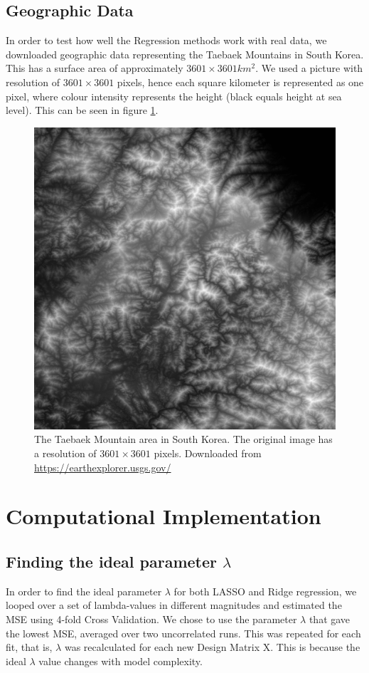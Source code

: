 \documentclass[11pt,a4paper,titlepage]{article}
\begin{document}
\subsection{Geographic Data}
In order to test how well the Regression methods work with real data, we downloaded geographic data representing the Taebaek Mountains in South Korea. This has a surface area of approximately $3601\times 3601 km^2$. We used a picture with resolution of $3601\times 3601$ pixels, hence each square kilometer is represented as one pixel, where colour intensity represents the height (black equals height at sea level). This can be seen in figure \ref{Korea}.
\begin{figure}[H]
\centering
\includegraphics[trim=1cm 0.2cm 1.5cm 1.2cm, clip=true,scale = 0.05]{../figures/presentable_data/korea.png}
\caption[Taebbaek Mountain]{The Taebaek Mountain area in South Korea. The original image has a resolution of $3601\times 3601$ pixels. Downloaded from \url{https://earthexplorer.usgs.gov/} }\label{Korea}
\end{figure}
\section{Computational Implementation}
\subsection{Finding the ideal parameter $\lambda$}
In order to find the ideal parameter $\lambda$ for both LASSO and Ridge regression, we looped over a set of lambda-values in different magnitudes and estimated the MSE using 4-fold Cross Validation. We chose to use the parameter $\lambda$ that gave the lowest MSE, averaged over two uncorrelated runs. This was repeated for each fit, that is,  $\lambda$ was recalculated for each new Design Matrix X. This is because the ideal $\lambda$ value changes with model complexity.
\end{document}
